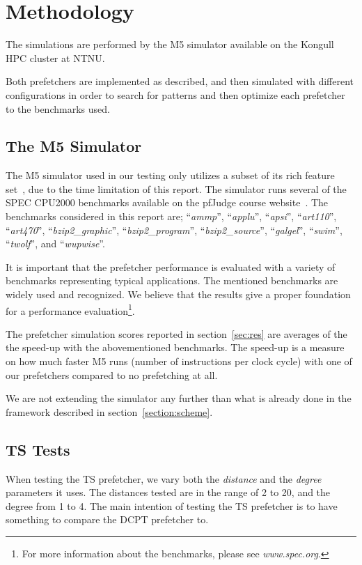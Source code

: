\section{Methodology}

The simulations are performed by the
M5 simulator available on the Kongull HPC cluster at NTNU.

Both prefetchers are implemented as described, and then simulated with different
configurations in order to search for patterns and then optimize each prefetcher
to the benchmarks used.

\subsection{The M5 Simulator}

The M5 simulator used in our testing only utilizes a subset of its rich feature
set~\cite{user_doc}, due to the time limitation of this report. The simulator
runs several of the SPEC CPU2000 benchmarks available on the pfJudge course
website~\cite{guidelines}. The benchmarks considered in this report are;
``\emph{ammp}'', ``\emph{applu}'', ``\emph{apsi}'', ``\emph{art110}'',
``\emph{art470}'', ``\emph{bzip2\_graphic}'', ``\emph{bzip2\_program}'',
``\emph{bzip2\_source}'', ``\emph{galgel}'', ``\emph{swim}'', ``\emph{twolf}'',
and ``\emph{wupwise}''.

It is important that the prefetcher performance is evaluated with a variety of
benchmarks representing typical applications. The mentioned benchmarks are
widely used and recognized. We believe that the results give a proper
foundation for a performance evaluation\footnote{For more information about the
benchmarks, please see \emph{www.spec.org}.}.

The prefetcher simulation scores reported in section~\ref{sec:res} are averages of the
the speed-up with the abovementioned benchmarks. The speed-up is a measure on
how much faster M5 runs (number of instructions per clock cycle) with one of our
prefetchers compared to no prefetching at all.

We are not extending the simulator any further than what is already done in the
framework described in section~\ref{section:scheme}.

\subsection{TS Tests}

When testing the TS prefetcher, we vary both the \emph{distance} and the
\emph{degree} parameters it uses. The distances tested are in the range of 2 to
20, and the degree from 1 to 4. The main intention of testing the TS prefetcher
is to have something to compare
the DCPT prefetcher to.

